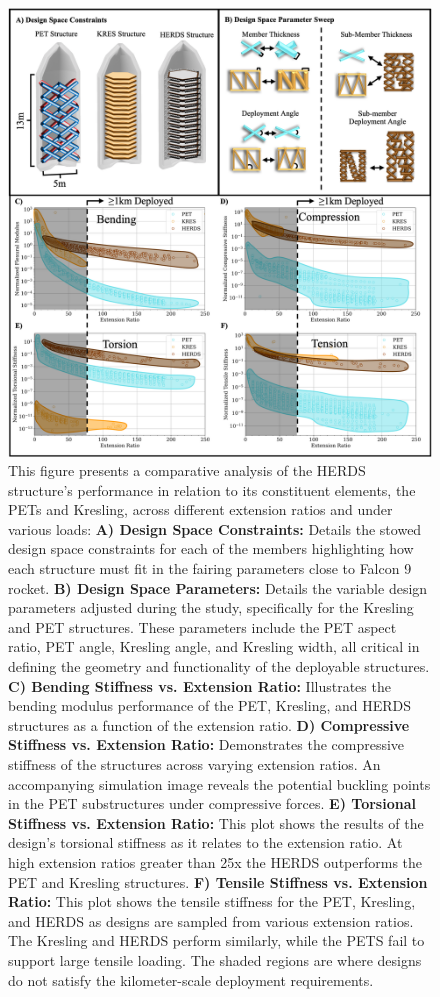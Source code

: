 \begin{figure}
    \centering
    \includegraphics[width=\linewidth]{Figures/Rebuttal/figure4_rebuttal_normalized.png}
    \caption{This figure presents a comparative analysis of the HERDS structure's performance in relation to its constituent elements, the PETs and Kresling, across different extension ratios and under various loads: {\textbf{A) Design Space Constraints:} Details the stowed design space constraints for each of the members highlighting how each structure must fit in the fairing parameters close to Falcon 9 rocket. }\textbf{B) Design Space Parameters:} Details the variable design parameters adjusted during the study, specifically for the Kresling and PET structures. These parameters include the PET aspect ratio, PET angle, Kresling angle, and Kresling width, all critical in defining the geometry and functionality of the deployable structures. \textbf{C) Bending Stiffness vs. Extension Ratio:} Illustrates the bending modulus performance of the PET, Kresling, and HERDS structures as a function of the extension ratio.  \textbf{D) Compressive Stiffness vs. Extension Ratio:} Demonstrates the compressive stiffness of the structures across varying extension ratios. An accompanying simulation image reveals the potential buckling points in the PET substructures under compressive forces. \textbf{E) Torsional Stiffness vs. Extension Ratio:} This plot shows the results of the design's torsional stiffness as it relates to the extension ratio. At high extension ratios greater than 25x the HERDS outperforms the PET and Kresling structures. \textbf{F) Tensile Stiffness vs. Extension Ratio:} This plot shows the tensile stiffness for the PET, Kresling, and HERDS as designs are sampled from various extension ratios. The Kresling and HERDS perform similarly, while the PETS fail to support large tensile loading. {The shaded regions are where designs do not satisfy the kilometer-scale deployment requirements.}}\label{fig:enter-label}
\end{figure}


